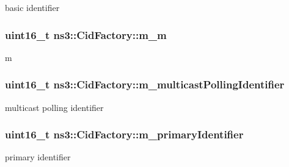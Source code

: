 basic identifier 

\subsubsection[{\texorpdfstring{m\+\_\+m}{m_m}}]{\setlength{\rightskip}{0pt plus 5cm}uint16\+\_\+t ns3\+::\+Cid\+Factory\+::m\+\_\+m\hspace{0.3cm}{\ttfamily [private]}}\hypertarget{classns3_1_1CidFactory_a109a5eb2a8113c30f0f1446017a88578}{}\label{classns3_1_1CidFactory_a109a5eb2a8113c30f0f1446017a88578}


m 

\subsubsection[{\texorpdfstring{m\+\_\+multicast\+Polling\+Identifier}{m_multicastPollingIdentifier}}]{\setlength{\rightskip}{0pt plus 5cm}uint16\+\_\+t ns3\+::\+Cid\+Factory\+::m\+\_\+multicast\+Polling\+Identifier\hspace{0.3cm}{\ttfamily [private]}}\hypertarget{classns3_1_1CidFactory_aa942d62831ffb00fddea228df435a303}{}\label{classns3_1_1CidFactory_aa942d62831ffb00fddea228df435a303}


multicast polling identifier 

\subsubsection[{\texorpdfstring{m\+\_\+primary\+Identifier}{m_primaryIdentifier}}]{\setlength{\rightskip}{0pt plus 5cm}uint16\+\_\+t ns3\+::\+Cid\+Factory\+::m\+\_\+primary\+Identifier\hspace{0.3cm}{\ttfamily [private]}}\hypertarget{classns3_1_1CidFactory_ae4ec7553ff7332a56fccd2ecb740fc87}{}\label{classns3_1_1CidFactory_ae4ec7553ff7332a56fccd2ecb740fc87}


primary identifier 

